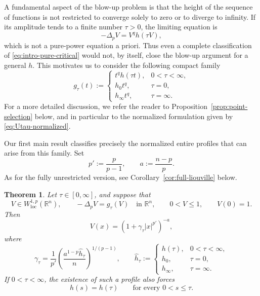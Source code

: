 \documentclass[reqno,12pt]{amsart}
\numberwithin{equation}{section}
\newtheorem{thm}{Theorem}[section]
\theoremstyle{remark}
\newcommand{\R}{\mathbb R}
\newcommand{\loc}{\mathrm{loc}}
\begin{document}
A fundamental aspect of the blow-up problem is that the height of the sequence of functions is not restricted to converge solely to zero or to diverge to infinity. If its amplitude tends to a finite
number $\tau>0$, the limiting equation is
$$
 -\Delta_pV=V^q h(\tau V),
$$
which is not a pure-power equation a priori.  Thus even a complete classification of \eqref{eq:intro-pure-critical} would not, by itself, close the blow-up argument for a general $h$.  This motivates us to consider the following compact family
\begin{equation}\label{eq:defn-ftau}
 g_\tau(t):=
 \begin{cases}
 t^qh(\tau t),&0<\tau<\infty,\\
 h_0t^q,&\tau=0,\\
 h_\infty t^q,&\tau=\infty.
 \end{cases}
\end{equation}
For a more detailed discussion, we refer the reader to Proposition~\ref{prop:point-selection} below, and in particular to the normalized formulation given by \eqref{eq:Utau-normalized}.


Our first main result classifies precisely the normalized entire profiles that can arise from this family. 
Set
$$
 p':=\frac{p}{p-1},  \qquad  a:=\frac{n-p}{p}.
$$
As for the fully unrestricted version, see Corollary~\ref{cor:full-liouville} below. 

\begin{thm}
\label{thm:frozen-classification}
Let $\tau\in[0,\infty]$, and suppose that
\begin{equation}\label{eq:frozen-equation}
 V\in W^{1,p}_{\loc}(\R^n),
 \qquad  -\Delta_pV=g_\tau(V)\quad\text{in }\R^n,
 \qquad  0<V\le1,
 \qquad  V(0)=1.
\end{equation}
Then
$$
 V(x)=\left(1+\gamma_\tau|x|^{p'}\right)^{-a},
$$
where
\begin{equation}\label{eq:gamma-tau}
 \gamma_\tau  =\frac1{p'}  \left(\frac{a^{1-p}\widehat h_\tau}{n}\right)^{1/(p-1)},
 \qquad 
 \widehat h_\tau:=
 \begin{cases}
 h(\tau),&0<\tau<\infty,\\
 h_0,&\tau=0,\\
 h_\infty,&\tau=\infty.
 \end{cases}
\end{equation}
If $0<\tau<\infty$, the existence of such a profile also forces
\begin{equation}\label{eq:h-flat-below-tau}
 h(s)=h(\tau)
 \qquad\text{for every }0<s\le\tau.
\end{equation}
\end{thm}
\end{document}
